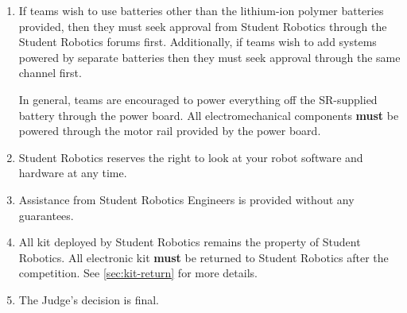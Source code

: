 \begin{enumerate}
\item If teams wish to use batteries other than the lithium-ion polymer batteries provided, then they must seek approval from Student Robotics through the Student Robotics forums first.  Additionally, if teams wish to add systems powered by separate batteries then they must seek approval through the same channel first.

 In general, teams are encouraged to power everything off the SR-supplied battery through the power board.
 All electromechanical components \textbf{must} be powered through the motor rail provided by the power board.
\item Student Robotics reserves the right to look at your robot software and hardware at any time.
\item Assistance from Student Robotics Engineers is provided without any guarantees.
\item All kit deployed by Student Robotics remains the property of Student Robotics.
 All electronic kit \textbf{must} be returned to Student Robotics after the competition. See \autoref{sec:kit-return} for more details.
\item The Judge's decision is final.


\end{enumerate}
